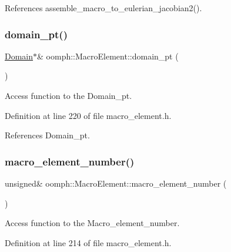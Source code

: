 References assemble\+\_\+macro\+\_\+to\+\_\+eulerian\+\_\+jacobian2().

\mbox{\label{classoomph_1_1MacroElement_ab086ff8cbdb656eff8ab5eafd67bca07}} 
\subsubsection{\texorpdfstring{domain\+\_\+pt()}{domain\_pt()}}
{\footnotesize\ttfamily \hyperlink{classoomph_1_1Domain}{Domain}$\ast$\& oomph\+::\+Macro\+Element\+::domain\+\_\+pt (\begin{DoxyParamCaption}{ }\end{DoxyParamCaption})\hspace{0.3cm}{\ttfamily [inline]}}



Access function to the Domain\+\_\+pt. 



Definition at line 220 of file macro\+\_\+element.\+h.



References Domain\+\_\+pt.

\mbox{\label{classoomph_1_1MacroElement_acc146caf3839d234c62cf9a4de2fbe91}} 
\subsubsection{\texorpdfstring{macro\+\_\+element\+\_\+number()}{macro\_element\_number()}}
{\footnotesize\ttfamily unsigned\& oomph\+::\+Macro\+Element\+::macro\+\_\+element\+\_\+number (\begin{DoxyParamCaption}{ }\end{DoxyParamCaption})\hspace{0.3cm}{\ttfamily [inline]}}



Access function to the Macro\+\_\+element\+\_\+number. 



Definition at line 214 of file macro\+\_\+element.\+h.



